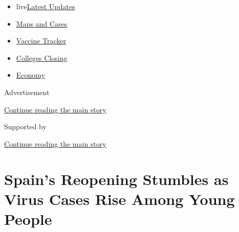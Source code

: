 \begin{itemize}
\tightlist
\item
  live\href{https://www.nytimes3xbfgragh.onion/2020/08/21/world/covid-19-coronavirus.html?name=styln-coronavirus-national\&region=TOP_BANNER\&variant=undefined\&block=storyline_menu_recirc\&action=click\&pgtype=Article\&impression_id=1bd9f9f0-e3b4-11ea-86f8-efc84775e6d4}{Latest
  Updates}
\item
  \href{https://www.nytimes3xbfgragh.onion/interactive/2020/us/coronavirus-us-cases.html?name=styln-coronavirus-national\&region=TOP_BANNER\&variant=undefined\&block=storyline_menu_recirc\&action=click\&pgtype=Article\&impression_id=1bd9f9f1-e3b4-11ea-86f8-efc84775e6d4}{Maps
  and Cases}
\item
  \href{https://www.nytimes3xbfgragh.onion/interactive/2020/science/coronavirus-vaccine-tracker.html?name=styln-coronavirus-national\&region=TOP_BANNER\&variant=undefined\&block=storyline_menu_recirc\&action=click\&pgtype=Article\&impression_id=1bd9f9f2-e3b4-11ea-86f8-efc84775e6d4}{Vaccine
  Tracker}
\item
  \href{https://www.nytimes3xbfgragh.onion/2020/08/19/us/colleges-closing-covid.html?name=styln-coronavirus-national\&region=TOP_BANNER\&variant=undefined\&block=storyline_menu_recirc\&action=click\&pgtype=Article\&impression_id=1bd9f9f3-e3b4-11ea-86f8-efc84775e6d4}{Colleges
  Closing}
\item
  \href{https://www.nytimes3xbfgragh.onion/live/2020/08/21/business/stock-market-today-coronavirus?name=styln-coronavirus-national\&region=TOP_BANNER\&variant=undefined\&block=storyline_menu_recirc\&action=click\&pgtype=Article\&impression_id=1bd9f9f4-e3b4-11ea-86f8-efc84775e6d4}{Economy}
\end{itemize}

Advertisement

\protect\hyperlink{after-top}{Continue reading the main story}

Supported by

\protect\hyperlink{after-sponsor}{Continue reading the main story}

\hypertarget{spains-reopening-stumbles-as-virus-cases-rise-among-young-people}{%
\section{Spain's Reopening Stumbles as Virus Cases Rise Among Young
People}\label{spains-reopening-stumbles-as-virus-cases-rise-among-young-people}}

